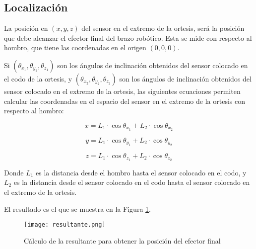 \subsection{Localización}

La posición en $(x, y, z)$ del sensor en el extremo de la ortesis, será la posición que debe alcanzar el efector final del brazo robótico. Esta se mide con respecto al hombro, que tiene las coordenadas en el origen $(0, 0 ,0)$.

Si $(\theta_{x_1}, \theta_{y_1}, \theta_{z_1})$ son los ángulos de inclinación obtenidos del sensor colocado en el codo de la ortesis, y $(\theta_{x_2}, \theta_{y_2}, \theta_{z_2})$ son los ángulos de inclinación obtenidos del sensor colocado en el extremo de la ortesis, las siguientes ecuaciones permiten calcular las coordenadas en el espacio del sensor en el extremo de la ortesis con respecto al hombro:

\begin{equation}
	x = L_1 \cdot \cos \theta_{x_1} +  L_2 \cdot \cos \theta_{x_2}
	\label{eq:angulox}
\end{equation}

\begin{equation}
	y = L_1 \cdot \cos \theta_{y_1} +  L_2 \cdot \cos \theta_{y_2}
	\label{eq:angulox}
\end{equation}

\begin{equation}
	z = L_1 \cdot \cos \theta_{z_1} +  L_2 \cdot \cos \theta_{z_2}
	\label{eq:angulox}
\end{equation}

Donde $L_1$ es la distancia desde el hombro hasta el sensor colocado en el codo, y $L_2$ es la distancia desde el sensor colocado en el codo hasta el sensor colocado en el extremo de la ortesis.

El resultado es el que se muestra en la Figura \ref{fig:resultante}.

\begin{figure}[htb]
	\centering
	\texttt{[image: resultante.png]}
	\caption{Cálculo de la resultante para obtener la posición del efector final}
	\label{fig:resultante}
\end{figure}